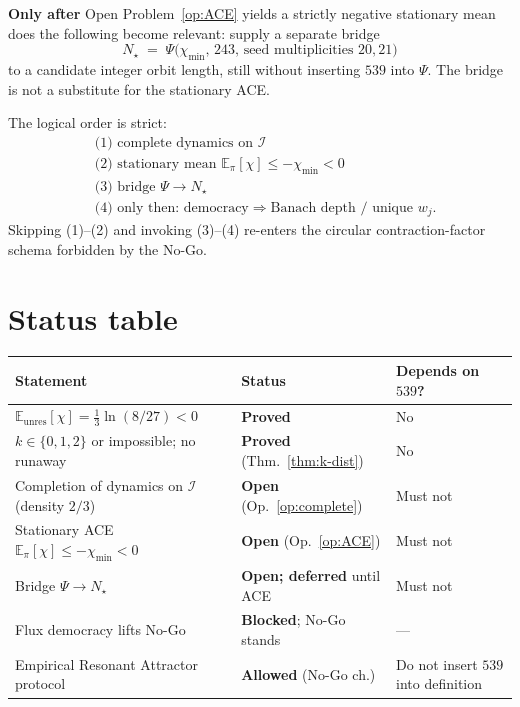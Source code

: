 \begin{openproblem}
\label{op:bridge}
\textbf{Only after} Open Problem~\ref{op:ACE} yields a strictly negative
stationary mean does the following become relevant: supply a separate bridge
\begin{equation}
\label{eq:bridge-ACE}
N_\star
\;=\;
\Psi\bigl(\chi_{\min},\,243,\,\text{seed multiplicities }20,21\bigr)
\end{equation}
to a candidate integer orbit length, still without inserting \(539\) into
\(\Psi\). The bridge is not a substitute for the stationary ACE.
\end{openproblem}

\begin{theorem}
\label{thm:order}
The logical order is strict:
\begin{equation}
\boxed{
\begin{aligned}
&\text{(1) complete dynamics on }\mathcal{I}
\\
&\text{(2) stationary mean }\mathbb{E}_\pi[\chi]\le -\chi_{\min}<0
\\
&\text{(3) bridge }\Psi\to N_\star
\\
&\text{(4) only then: democracy}\Rightarrow\text{Banach depth / unique }w_j.
\end{aligned}
}
\end{equation}
Skipping (1)--(2) and invoking (3)--(4) re-enters the circular
contraction-factor schema forbidden by the No-Go.
\end{theorem}

\section{Status table}
\label{sec:status}

\begin{center}
\begin{tabular}{@{}p{}p{}p{}@{}}
\toprule
Statement & Status & Depends on \(539\)? \\
\midrule
\(\mathbb{E}_{\mathrm{unres}}[\chi]=\frac13\ln(8/27)<0\) &
\textbf{Proved} &
No \\
\(k\in\{0,1,2\}\) or impossible; no runaway &
\textbf{Proved} (Thm.~\ref{thm:k-dist}) &
No \\
Completion of dynamics on \(\mathcal{I}\) (density \(2/3\)) &
\textbf{Open} (Op.~\ref{op:complete}) &
Must not \\
Stationary ACE \(\mathbb{E}_\pi[\chi]\le -\chi_{\min}<0\) &
\textbf{Open} (Op.~\ref{op:ACE}) &
Must not \\
Bridge \(\Psi\to N_\star\) &
\textbf{Open; deferred} until ACE &
Must not \\
Flux democracy lifts No-Go &
\textbf{Blocked}; No-Go stands &
--- \\
Empirical Resonant Attractor protocol &
\textbf{Allowed} (No-Go ch.) &
Do not insert \(539\) into definition \\
\bottomrule
\end{tabular}
\end{center}

